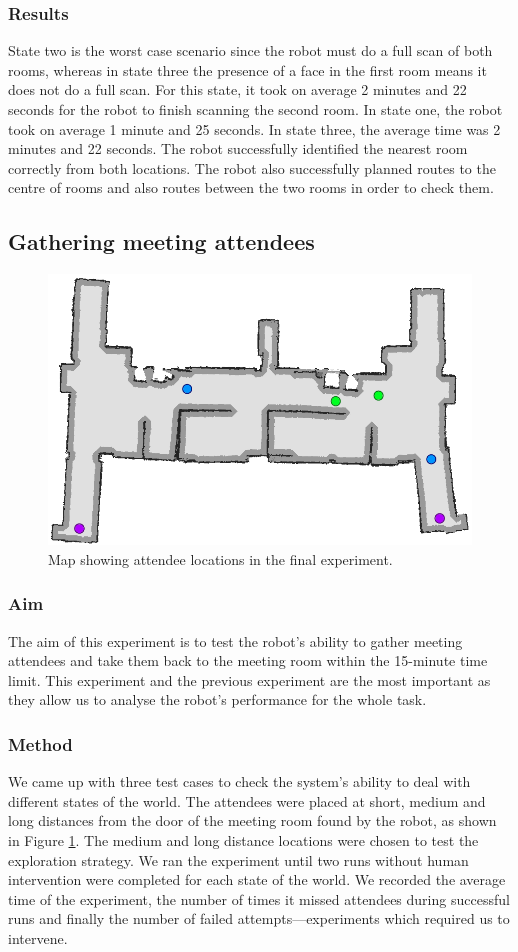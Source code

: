 \documentclass[conference]{IEEEtran}
\begin{document}
\subsubsection{Results}
State two is the worst case scenario since the robot must do a full scan of both rooms, whereas in state three the presence of a face in the first room means it does not do a full scan. For this state, it took on average 2 minutes and 22 seconds for the robot to finish scanning the second room. In state one, the robot took on average 1 minute and 25 seconds. In state three, the average time was 2 minutes and 22 seconds. The robot successfully identified the nearest room correctly from both locations. The robot also successfully planned routes to the centre of rooms and also routes between the two rooms in order to check them.
\subsection{Gathering meeting attendees}
\begin{figure}
  \includegraphics[width=\columnwidth]{explorationpeople}
  \caption{Map showing attendee locations in the final experiment.}
  \label{fig:attendees}
\end{figure}
\subsubsection{Aim}
The aim of this experiment is to test the robot's ability to gather meeting attendees and take them back to the meeting room within the 15-minute time limit. This experiment and the previous experiment are the most important as they allow us to analyse the robot's performance for the whole task.
\subsubsection{Method}
We came up with three test cases to check the system's ability to deal with different states of the world. The attendees were placed at short, medium and long distances from the door of the meeting room found by the robot, as shown in Figure \ref{fig:attendees}. The medium and long distance locations were chosen to test the exploration strategy. We ran the experiment until two runs without human intervention were completed for each state of the world. We recorded the average time of the experiment, the number of times it missed attendees during successful runs and finally the number of failed attempts---experiments which required us to intervene.
\end{document}
